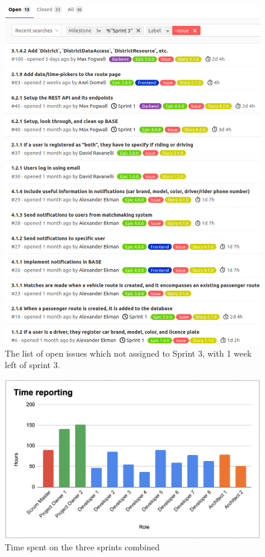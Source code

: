 \documentclass{article}
\begin{document}
\begin{figure}[h!]
    \centering
    \includegraphics[scale=0.6]{pfrFigures/forgotten_issues.png}
    \caption{The list of open issues which not assigned to Sprint 3, with 1 week left of sprint 3.}
    \label{fig:forgotten_issues}
\end{figure}

\begin{figure}[h!]
    \centering
    \includegraphics[scale=0.6]{pfrFigures/TimeReporting.png}
    \caption{Time spent on the three sprints combined}
    \label{fig:timereport}
\end{figure}
\end{document}
